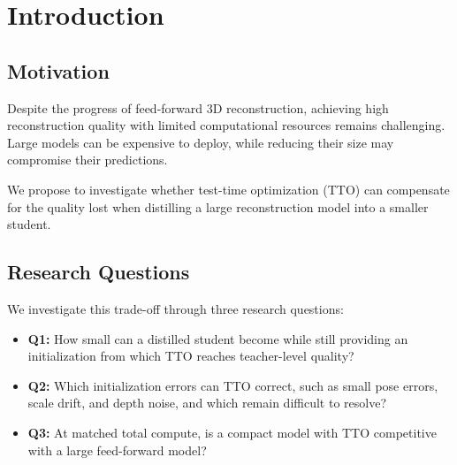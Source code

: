 \section{Introduction}
\label{sec:intro}

\subsection{Motivation}

Despite the progress of feed-forward 3D reconstruction, achieving high reconstruction quality with limited computational resources remains challenging. Large models can be expensive to deploy, while reducing their size may compromise their predictions.

We propose to investigate whether test-time optimization (TTO) can compensate for the quality lost when distilling a large reconstruction model into a smaller student.

\subsection{Research Questions}

We investigate this trade-off through three research questions:

\begin{itemize}
    \item \textbf{Q1:} How small can a distilled student become while still providing an initialization from which TTO reaches teacher-level quality?
    \item \textbf{Q2:} Which initialization errors can TTO correct, such as small pose errors, scale drift, and depth noise, and which remain difficult to resolve?
    \item \textbf{Q3:} At matched total compute, is a compact model with TTO competitive with a large feed-forward model?
\end{itemize}

